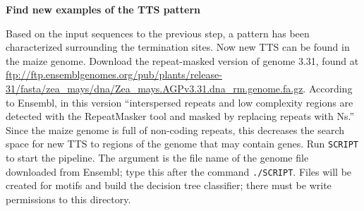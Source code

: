 \documentclass[12pt,letterpaper]{report}
\begin{document}
\begin{center}
\textbf{{\large Find new examples of the TTS pattern}}
\end{center}
Based on the input sequences to the previous step, a pattern has been characterized surrounding the termination sites. Now new TTS can be found in the maize genome. Download the repeat-masked version of genome 3.31, found at \url{ftp://ftp.ensemblgenomes.org/pub/plants/release-31/fasta/zea_mays/dna/Zea_mays.AGPv3.31.dna_rm.genome.fa.gz}. According to Ensembl, in this version ``interspersed repeats and low complexity regions are detected with the RepeatMasker tool and masked by replacing repeats with Ns.'' Since the maize genome is full of non-coding repeats, this decreases the search space for new TTS to regions of the genome that may contain genes.
\indent Run \texttt{SCRIPT} to start the pipeline. The argument is the file name of the genome file downloaded from Ensembl; type this after the command \texttt{./SCRIPT}. Files will be created for motifs and build the decision tree classifier; there must be write permissions to this directory. 
\end{document}
